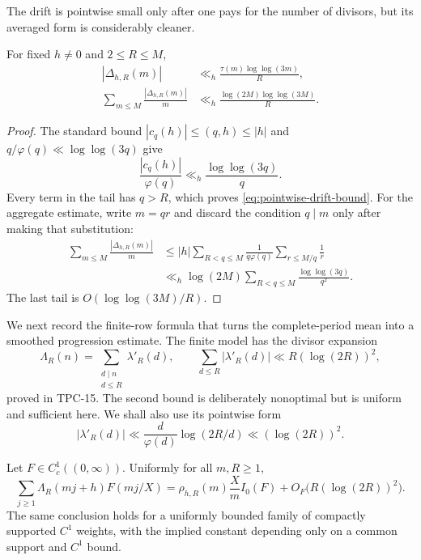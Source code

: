 The drift is pointwise small only after one pays for the number of
divisors, but its averaged form is considerably cleaner.

\begin{lemma}
\label{lem:drift-bounds}
For fixed $h\ne0$ and $2\le R\le M$,
\begin{align}
 |\Delta_{h,R}(m)|
 &\ll_h \frac{\tau(m)\log\log(3m)}R,
 \label{eq:pointwise-drift-bound}\\
 \sum_{m\le M}\frac{|\Delta_{h,R}(m)|}{m}
 &\ll_h \frac{\log(2M)\log\log(3M)}R.
 \label{eq:aggregate-drift-bound}
\end{align}
\end{lemma}

\begin{proof}
The standard bound $|c_q(h)|\le(q,h)\le|h|$ and
$q/\varphi(q)\ll\log\log(3q)$ give
\[
 \frac{|c_q(h)|}{\varphi(q)}
 \ll_h\frac{\log\log(3q)}q.
\]
Every term in the tail has $q>R$, which proves
\eqref{eq:pointwise-drift-bound}.  For the aggregate estimate, write
$m=qr$ and discard the condition $q\mid m$ only after making that
substitution:
\begin{align*}
 \sum_{m\le M}\frac{|\Delta_{h,R}(m)|}{m}
 &\le |h|\sum_{R<q\le M}\frac1{q\varphi(q)}
 \sum_{r\le M/q}\frac1r\\
 &\ll_h \log(2M)
 \sum_{R<q\le M}\frac{\log\log(3q)}{q^2}.
\end{align*}
The last tail is $O(\log\log(3M)/R)$.
\end{proof}

We next record the finite-row formula that turns the complete-period mean
into a smoothed progression estimate.  The finite model has the divisor
expansion
\begin{equation}
 \Lambda_R(n)=\sum_{\substack{d\mid n\\d\le R}}\lambda'_R(d),
 \qquad
 \sum_{d\le R}|\lambda'_R(d)|\ll R(\log(2R))^2,
 \label{eq:model-divisor-expansion-short}
\end{equation}
proved in TPC-15.  The second bound is deliberately nonoptimal but is
uniform and sufficient here.
We shall also use its pointwise form
\begin{equation}
 |\lambda'_R(d)|
 \ll\frac d{\varphi(d)}\log(2R/d)
 \ll(\log(2R))^2.
 \label{eq:model-divisor-coefficient-pointwise}
\end{equation}

\begin{lemma}
\label{lem:finite-row-leakage}
Let $F\in C_c^1((0,\infty))$.  Uniformly for all $m,R\ge1$,
\begin{equation}
 \sum_{j\ge1}\Lambda_R(mj+h)F(mj/X)
 =\rho_{h,R}(m)\frac Xm I_0(F)
 +O_F\bigl(R(\log(2R))^2\bigr).
 \label{eq:finite-row-model-formula}
\end{equation}
The same conclusion holds for a uniformly bounded family of compactly
supported $C^1$ weights, with the implied constant depending only on a
common support and $C^1$ bound.
\end{lemma}


